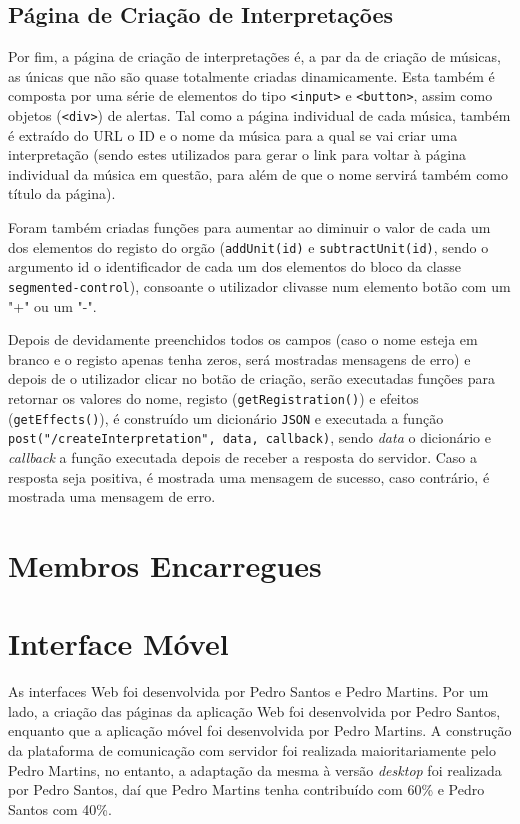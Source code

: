 \documentclass[a4paper,11pt,openright,oneside]{report}
\begin{document}
\subsection{Página de Criação de Interpretações}
\label{sec.mobile.createinterpretation}

Por fim, a página de criação de interpretações é, a par da de criação de músicas, as únicas que não são quase totalmente criadas dinamicamente. Esta também é composta por uma série de elementos do tipo \texttt{<input>} e \texttt{<button>}, assim como objetos (\texttt{<div>}) de alertas. Tal como a página individual de cada música, também é extraído do URL o ID e o nome da música para a qual se vai criar uma interpretação (sendo estes utilizados para gerar o link para voltar à página individual da música em questão, para além de que o nome servirá também como título da página).

Foram também criadas funções para aumentar ao diminuir o valor de cada um dos elementos do registo do orgão (\texttt{addUnit(id)} e \texttt{subtractUnit(id)}, sendo o argumento id o identificador de cada um dos elementos do bloco da classe \texttt{segmented-control}), consoante o utilizador clivasse num elemento botão com um "+" ou um "-".

Depois de devidamente preenchidos todos os campos (caso o nome esteja em branco e o registo apenas tenha zeros, será mostradas mensagens de erro) e depois de o utilizador clicar no botão de criação, serão executadas funções para retornar os valores do nome, registo (\texttt{getRegistration()}) e efeitos (\texttt{getEffects()}), é construído um dicionário \verb|JSON| e executada a função \texttt{post("/createInterpretation", data, callback)}, sendo \textit{data} o dicionário e \textit{callback} a função executada depois de receber a resposta do servidor. Caso a resposta seja positiva, é mostrada uma mensagem de sucesso, caso contrário, é mostrada uma mensagem de erro.

\section*{Membros Encarregues}
\section{Interface Móvel}
\label{sec.mobile}

As interfaces Web foi desenvolvida por Pedro Santos e Pedro Martins. Por um lado, a criação das páginas da aplicação Web foi desenvolvida por Pedro Santos, enquanto que a aplicação móvel foi desenvolvida por Pedro Martins. A construção da plataforma de comunicação com servidor foi realizada maioritariamente pelo Pedro Martins, no entanto, a adaptação da mesma à versão \textit{desktop} foi realizada por Pedro Santos, daí que Pedro Martins tenha contribuído com 60\% e Pedro Santos com 40\%.
\end{document}
